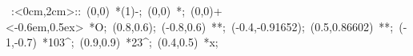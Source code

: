 %


\hbox{
\xy    <2cm,0cm>:<0cm,2cm>::
       (0,0) *\ellipse(1){-}; 
       (0,0) *{\bullet}; (0,0)+<-0.6em,0.5ex> *{O};
       (0.8,0.6); (-0.8,0.6) **\dir{-}; 
       (-0.4,-0.91652); (0.5,0.86602) **\dir{-};
       (-1,-0.7) *{103^\circ};
       (0.9,0.9) *{23^\circ};
       (0.4,0.5) *{x};
\endxy}

